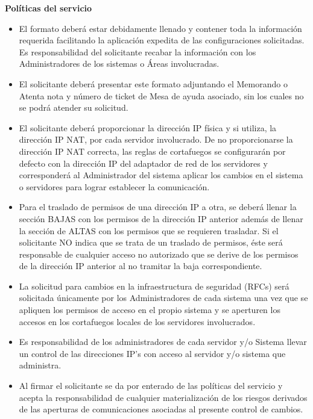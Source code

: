 \documentclass[letterpaper,11pt,landscape]{article}
\begin{document}
\textbf{\large Políticas del servicio}
{ \small \begin{itemize}
	        \item El formato deberá estar debidamente llenado y contener toda la información requerida facilitando la aplicación expedita de las configuraciones solicitadas. Es responsabilidad del solicitante recabar la información con los Administradores de los sistemas o Áreas involucradas.
			\item El solicitante deberá presentar este formato adjuntando el Memorando o Atenta nota y número de ticket de Mesa de ayuda asociado, sin los cuales no se podrá atender su solicitud. 
			\item El solicitante deberá proporcionar la dirección IP física y si utiliza, la dirección IP NAT, por cada servidor involucrado. De no proporcionarse la dirección IP NAT correcta, las reglas de cortafuegos se configurarán por defecto con la dirección IP del adaptador de red de los servidores y corresponderá al Administrador del sistema aplicar los cambios en el sistema o servidores para lograr establecer la comunicación.
			\item Para el traslado de permisos de una dirección IP a otra, se deberá llenar la sección BAJAS con los permisos de la dirección IP anterior además de llenar la sección de ALTAS con los permisos que se requieren trasladar. Si el solicitante NO indica que se trata de un traslado de permisos, éste será responsable de cualquier acceso no autorizado que se derive de los permisos de la dirección IP anterior al no tramitar la baja correspondiente.
			\item La solicitud para cambios en la infraestructura de seguridad (RFCs) será solicitada únicamente por los Administradores de cada sistema una vez que se apliquen los permisos de acceso en el propio sistema y se aperturen los accesos en los cortafuegos locales de los servidores involucrados.
			\item Es responsabilidad de los administradores de cada servidor y/o Sistema llevar un control de las direcciones IP’s con acceso al servidor y/o sistema que administra.
			\item Al firmar el solicitante se da por enterado de las políticas del servicio y acepta la responsabilidad de cualquier materialización de los riesgos derivados de las aperturas de comunicaciones asociadas al presente control de cambios.

\end{itemize}

}
\end{document}
